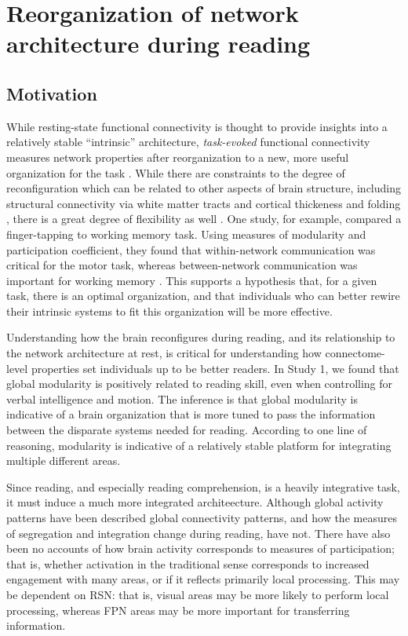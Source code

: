 \chapter{Reorganization of network architecture during reading}

\section{Motivation}

While resting-state functional connectivity is thought to provide insights into a relatively stable ``intrinsic'' architecture, \textit{task-evoked} functional connectivity measures network properties after reorganization to a new, more useful organization for the task \citep{Cohen2016}. While there are constraints to the degree of reconfiguration which can be related to other aspects of brain structure, including structural connectivity via white matter tracts and cortical thickeness and folding \citep{Sui2014}, there is a great degree of flexibility as well \citep{Cole2013}. One study, for example, compared a finger-tapping to working memory task. Using measures of modularity and participation coefficient, they found that within-network communication was critical for the motor task, whereas between-network communication was important for working memory \citep{Cohen2016}. This supports a hypothesis that, for a given task, there is an optimal organization, and that individuals who can better rewire their intrinsic systems to fit this organization will be more effective. 

Understanding how the brain reconfigures during reading, and its relationship to the network architecture at rest, is critical for understanding how connectome-level properties set individuals up to be better readers. In Study 1, we found that global modularity is positively related to reading skill, even when controlling for verbal intelligence and motion. The inference is that global modularity is indicative of a brain organization that is more tuned to pass the information between the disparate systems needed for reading. According to one line of reasoning, modularity is indicative of a relatively stable platform for integrating multiple different areas. 

Since reading, and especially reading comprehension, is a heavily integrative task, it must induce a much more integrated architeecture. Although global activity patterns have been described \citep{Rimrodt2009, Xu2006} global connectivity patterns, and how the measures of segregation and integration change during reading, have not. There have also been no accounts of how brain activity corresponds to measures of participation; that is, whether activation in the traditional sense corresponds to increased engagement with many areas, or if it reflects primarily local processing. This may be dependent on RSN: that is, visual areas may be more likely to perform local processing, whereas FPN areas may be more important for transferring information. 

